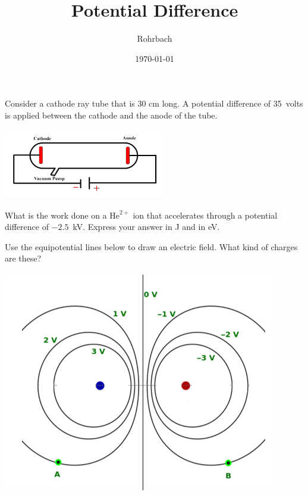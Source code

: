 \documentclass[10pt]{exam}
\title{Potential Difference}
\author{Rohrbach}
\date{\today}
\begin{document}
\maketitle

\begin{questions}
  \question
    Consider a cathode ray tube that is 30 cm long. A potential difference of 35~volts is applied between the cathode and the anode of the tube.

    \includegraphics[width=7cm]{CathodeRay.png}


  \question 
    What is the work done on a $\text{He}^{2+}$ ion that accelerates through a potential difference of $-2.5$~kV. Express your answer in J and in eV. \vs[2]

\pagebreak
  \question
    Use the equipotential lines below to draw an electric field. What kind of charges are these?

    \includegraphics{equipotential.png}


\end{questions}
\end{document}
